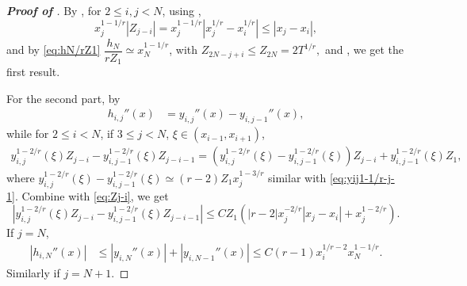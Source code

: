 \documentclass{amsart}
\theoremstyle{definition}
\theoremstyle{remark}
\numberwithin{equation}{section}
\begin{document}
\begin{proof} [\bf Proof of ]
  By ,  
  for \(2 \le i, j < N\), 
  using , 
  \begin{equation} \label{eq:Zj-i}
    x_j^{1-1/r} |Z_{j-i}| = x_j^{1-1/r} |x_j^{1/r} - x_i^{1/r}| \le |x_j - x_i|,
  \end{equation}
  and by \eqref{eq:hN/rZ1} \(\dfrac{h_N}{r Z_1} \simeq x_N^{1-1/r}\), with
  \(
    Z_{2N-j+i} \le Z_{2N} =  2 T^{1/r},
  \)
  and , we get the first result.

  For the second part, by 
  \begin{equation*}
    \begin{aligned}
      h_{i,j}''(x) &= y_{i,j}''(x) - y_{i,j-1}''(x),
    \end{aligned}
  \end{equation*}
  while for \(2\le i<N\), if \(3\le j<N\), \(\xi\in (x_{i-1}, x_{i+1})\),
  \begin{equation} \label{eq:yij1-2/rZj-i-depart}
    \begin{aligned}
      y_{i,j}^{1-2/r}(\xi) Z_{j-i} - y_{i,j-1}^{1-2/r}(\xi) Z_{j-i-1}
      = \left( y_{i,j}^{1-2/r}(\xi) - y_{i,j-1}^{1-2/r}(\xi) \right) Z_{j-i} + y_{i, j-1}^{1-2/r}(\xi) Z_1,
    \end{aligned}
  \end{equation}
  where \(y_{i,j}^{1-2/r}(\xi) - y_{i,j-1}^{1-2/r}(\xi) \simeq (r-2) Z_1 x_j^{1-3/r} \) similar with \eqref{eq:yij1-1/r-j-1}. Combine with \eqref{eq:Zj-i}, we get
  \begin{equation*} \label{eq:yij1-2/rZj-i-}
    |y_{i,j}^{1-2/r}(\xi) Z_{j-i} - y_{i,j-1}^{1-2/r}(\xi) Z_{j-i-1}| \le C Z_1 \left( |r-2| x_j^{-2/r}|x_j - x_i| + x_j^{1-2/r}  \right).
  \end{equation*}
  If \(j=N\), 
  \begin{equation*}
    \begin{aligned}
      |h_{i,N}''(x)| &\le |y_{i,N}''(x)| + |y_{i,N-1}''(x)| \le C (r-1) x_i^{1/r-2} x_N^{1-1/r}.
    \end{aligned}
  \end{equation*}
  Similarly if \(j= N+1\).


\end{proof}
\end{document}
